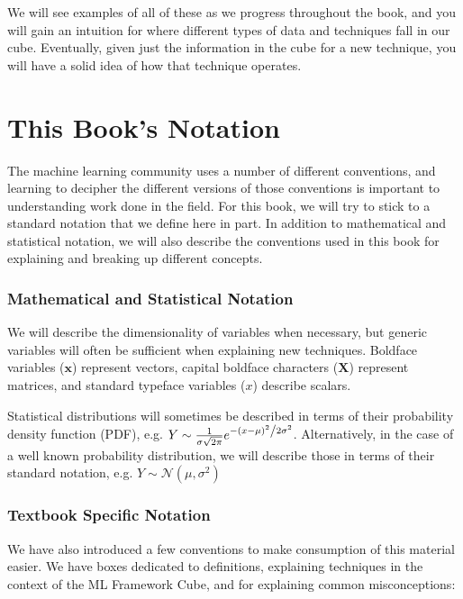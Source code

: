 We will see examples of all of these as we progress throughout the book, and you will gain an intuition for where different types of data and techniques fall in our cube. Eventually, given just the information in the cube for a new technique, you will have a solid idea of how that technique operates.

\section{This Book's Notation}

The machine learning community uses a number of different conventions, and learning to decipher the different versions of those conventions is important to understanding work done in the field. For this book, we will try to stick to a standard notation that we define here in part. In addition to mathematical and statistical notation, we will also describe the conventions used in this book for explaining and breaking up different concepts.

\subsubsection{Mathematical and Statistical Notation}
We will describe the dimensionality of variables when necessary, but generic variables will often be sufficient when explaining new techniques. Boldface variables ($\textbf{x}$) represent vectors, capital boldface characters ($\textbf{X}$) represent matrices, and standard typeface variables ($x$) describe scalars.

Statistical distributions will sometimes be described in terms of their probability density function (PDF), e.g. $Y \sim \frac{1}{{\sigma \sqrt {2\pi } }}e^{{{ - \left( {x - \mu } \right)^2 } \mathord{\left/ {\vphantom {{ - \left( {y - \mu } \right)^2 } {2\sigma ^2 }}} \right. \kern-\nulldelimiterspace} {2\sigma ^2 }}}$. Alternatively, in the case of a well known probability distribution, we will describe those in terms of their standard notation, e.g. $Y \sim \mathcal{N}(\mu, \sigma^2)$

\subsubsection{Textbook Specific Notation}
We have also introduced a few conventions to make consumption of this material easier. We have boxes dedicated to definitions, explaining techniques in the context of the ML Framework Cube, and for explaining common misconceptions: \newline

